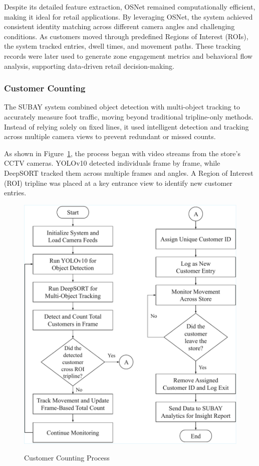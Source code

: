 {Despite its detailed feature extraction, OSNet remained computationally efficient, making it ideal for retail applications. By leveraging OSNet, the system achieved consistent identity matching across different camera angles and challenging conditions. As customers moved through predefined Regions of Interest (ROIs), the system tracked entries, dwell times, and movement paths. These tracking records were later used to generate zone engagement metrics and behavioral flow analysis, supporting data-driven retail decision-making.

\subsubsection{Customer Counting}

The SUBAY system combined object detection with multi-object tracking to accurately measure foot traffic, moving beyond traditional tripline-only methods. Instead of relying solely on fixed lines, it used intelligent detection and tracking across multiple camera views to prevent redundant or missed counts.

As shown in Figure~\ref{fig:3.20}, the process began with video streams from the store’s CCTV cameras. YOLOv10 detected individuals frame by frame, while DeepSORT tracked them across multiple frames and angles. A Region of Interest (ROI) tripline was placed at a key entrance view to identify new customer entries.

\begin{figure}[H]
	\caption[Customer Counting Process]{\newline \newline Customer Counting Process}
	\centering
	\includegraphics[width=0.50\linewidth]{fig/3.20.pdf}
	\label{fig:3.20}
\end{figure}

}
